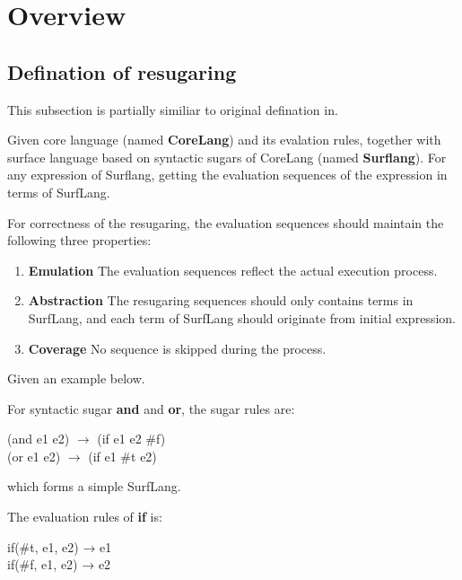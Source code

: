 \section{Overview}
\label{sec2}

\subsection{Defination of resugaring}
This subsection is partially similiar to original defination in\cite{resugaring}.
\begin{Def}[Resugaring]
Given core language (named {\bfseries CoreLang}) and its evalation rules, together with surface language based on syntactic sugars of CoreLang (named {\bfseries Surflang}). For any expression of Surflang, getting the evaluation sequences of the expression in terms of SurfLang. 
\end{Def}
For correctness of the resugaring, the evaluation sequences should maintain the following three properties:
\begin{enumerate}
\item {\bfseries Emulation} The evaluation sequences reflect the actual execution process.
\item {\bfseries Abstraction} The resugaring sequences should only contains terms in SurfLang, and each term of SurfLang should originate from initial expression.
\item {\bfseries Coverage} No sequence is skipped during the process.
\end{enumerate}

Given an example below.

For syntactic sugar {\bfseries and} and {\bfseries or}, the sugar rules are:

\begin{center}
	\parbox[t]{\textwidth}{%
		\begin{flushleft}  
			(and e1 e2) $\rightarrow$ (if e1 e2 \#f)\\
			(or e1 e2) $\rightarrow$ (if e1 \#t e2)
		\end{flushleft}  
	}%
\end{center}
which forms a simple SurfLang.

The evaluation rules of {\bfseries if} is:
\begin{center}
	\parbox[t]{\textwidth}{%
		\begin{center}  
			if(\#t, e1, e2) → e1\\
			if(\#f, e1, e2) → e2
		\end{center}  
	}%
\end{center}

